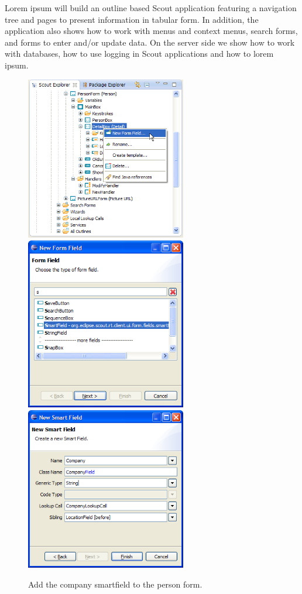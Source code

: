 \documentclass[a4paper,10pt,twoside]{book}
\begin{document}
Lorem ipsum will build an outline based Scout application featuring a navigation tree and pages to present information in tabular form. 
In addition, the application also shows how to work with menus and context menus, search forms, and forms to enter and/or update data. 
On the server side we show how to work with databases, how to use logging in Scout applications and how to lorem ipsum. 

\begin{figure}
\includegraphics[width=7cm]{new_smartfield_company_contextmenu.png} \hspace{2mm}
\includegraphics[width=7cm]{new_smartfield_company_1.png} \hspace{2mm}
\includegraphics[width=7cm]{new_smartfield_company_2.png}
\caption{Add the company smartfield to the person form.}
\end{figure}
\end{document}
